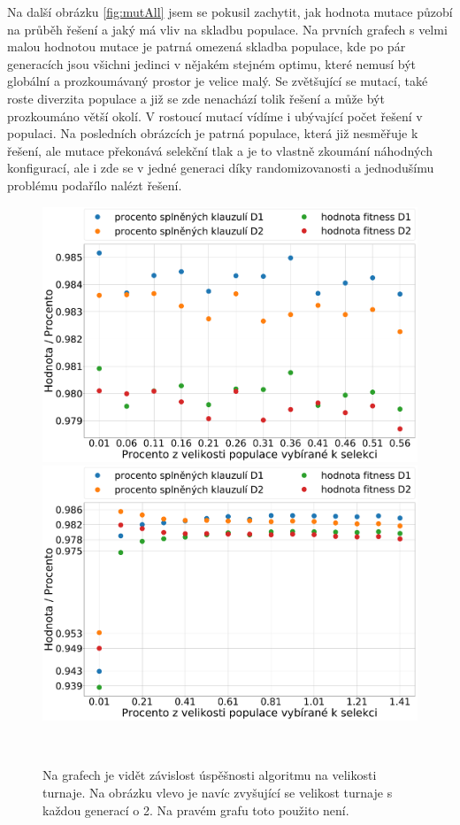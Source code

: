 \documentclass[11pt]{article}
\begin{document}
Na další obrázku \ref{fig:mutAll} jsem se pokusil zachytit, jak hodnota mutace půzobí na průběh řešení a jaký má vliv na skladbu populace. Na prvních grafech s velmi malou hodnotou mutace je patrná omezená skladba populace, kde po pár generacích jsou všichni jedinci v nějakém stejném optimu, které nemusí být globální a prozkoumávaný prostor je velice malý. Se zvětšující se mutací, také roste diverzita populace a již se zde nenachází tolik řešení a může být prozkoumáno větší okolí. V rostoucí mutací vídíme i ubývající počet řešení v populaci. Na posledních obrázcích je patrná populace, která již nesměřuje k řešení, ale mutace překonává selekční tlak a je to vlastně zkoumání náhodných konfigurací, ale i zde se v jedné generaci díky randomizovanosti a jednodušímu problému podařílo nalézt řešení. 

\begin{figure}
	\centering
    \begin{minipage}[c]{0.48\textwidth}
        \centering\includegraphics[width=\textwidth]{img/sat_s_small.pdf} 
    \end{minipage}
    \begin{minipage}[c]{0.48\textwidth}
        \centering \includegraphics[width=\textwidth]{img/sat_s_big.pdf} 
    \end{minipage}
    \\
   \caption{Na grafech je vidět závislost úspěšnosti algoritmu na velikosti turnaje. Na obrázku vlevo je navíc zvyšující se velikost turnaje s každou generací o 2. Na pravém grafu toto použito není.}\label{fig:sel}
\end{figure} 
\end{document}
